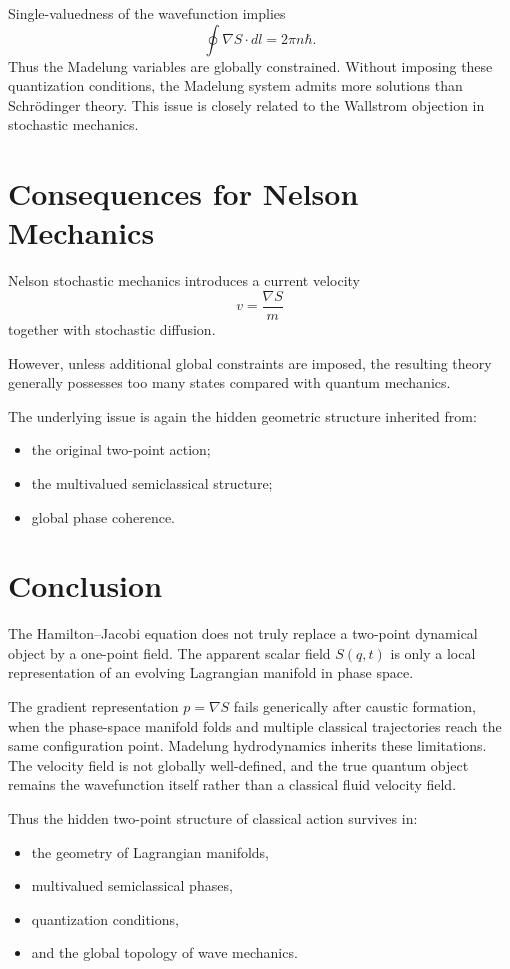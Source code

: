 Single-valuedness of the wavefunction implies 
\begin{equation} 
    \oint \nabla S\cdot dl =2\pi n\hbar. 
\end{equation} 
Thus the Madelung variables are globally
constrained. Without imposing these quantization conditions, the Madelung
system admits more solutions than Schr\"odinger theory. This issue is closely
related to the Wallstrom objection in stochastic mechanics.

\section{Consequences for Nelson Mechanics}

Nelson stochastic mechanics introduces a current velocity
\[v=\frac{\nabla S}{m}\]
together with stochastic diffusion.

However, unless additional global constraints are imposed, the resulting theory
generally possesses too many states compared with quantum mechanics.

The underlying issue is again the hidden geometric structure inherited from:
\begin{itemize}
\item the original two-point action;
\item the multivalued semiclassical structure;
\item global phase coherence.
\end{itemize}

\section{Conclusion}

The Hamilton--Jacobi equation does not truly replace a two-point dynamical
object by a one-point field. The apparent scalar field $S(q,t)$ is only a local
representation of an evolving Lagrangian manifold in phase space.

The gradient representation $p=\nabla S$ fails generically after caustic
formation, when the phase-space manifold folds and multiple classical
trajectories reach the same configuration point.
Madelung hydrodynamics inherits these limitations. The velocity field is not
globally well-defined, and the true quantum object remains the wavefunction
itself rather than a classical fluid velocity field.

Thus the hidden two-point structure of classical action survives in:
\begin{itemize}
\item the geometry of Lagrangian manifolds,
\item multivalued semiclassical phases,
\item quantization conditions,
\item and the global topology of wave mechanics.
\end{itemize}
